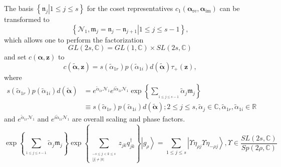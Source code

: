 \documentclass[aps,preprint]{revtex4}%
\begin{document}
The basis $\left\{  \left.  \mathfrak{n}_{j}\right\vert 1\leq j\leq s\right\}
$ for the coset representatives $c_{1}\left(  \mathbf{\alpha}_{\mathrm{re}%
},\mathbf{\alpha}_{\mathrm{im}}\right)  $ can be transformed to
\begin{equation}
\left\{  \left.  \mathcal{N}_{1},\mathfrak{m}_{j}=\mathfrak{n}_{j}%
-\mathfrak{n}_{j+1}\right\vert 1\leq j\leq s-1\right\}  ,
\end{equation}
which allows one to perform the factorization
\begin{equation}
GL\left(  2s,\mathbb{C}\right)  =GL\left(  1,\mathbb{C}\right)  \times
SL\left(  2s,\mathbb{C}\right)
\end{equation}
and set $c\left(  \mathbf{\alpha,z}\right)  $ to
\begin{equation}
c\left(  \mathbf{\tilde{\alpha},z}\right)  =\mathit{s}\left(  \tilde{\alpha
}_{1r}\right)  \mathit{p}\left(  \tilde{\alpha}_{1i}\right)  d\left(
\mathbf{\tilde{\alpha}}\right)  \tau_{+}\left(  \mathbf{z}\right)  ,
\end{equation}
where
\begin{align}
\mathit{s}\left(  \tilde{\alpha}_{1r}\right)  \mathit{p}\left(  \tilde{\alpha
}_{1i}\right)  d\left(  \mathbf{\tilde{\alpha}}\right)   &  =e^{\tilde{\alpha
}_{1r}\mathcal{N}_{1}}e^{i\tilde{\alpha}_{1i}\mathcal{N}_{1}}\exp\left\{
\sum\limits_{_{1\leq j\leq s-1}}\tilde{\alpha}_{j}\mathfrak{m}_{j}\right\} \\
&  \equiv\mathit{s}\left(  \tilde{\alpha}_{1r}\right)  \mathit{p}\left(
\tilde{\alpha}_{1i}\right)  d\left(  \mathbf{\tilde{\alpha}}\right)  ;2\leq
j\leq s,\tilde{\alpha}_{j}\in\mathbb{C},\tilde{\alpha}_{1r},\tilde{\alpha
}_{1i}\in\mathbb{R}%
\end{align}
and $e^{\tilde{\alpha}_{1r}\mathcal{N}_{1}}$ and $e^{i\tilde{\alpha}%
_{1i}\mathcal{N}_{1}}$ are overall scaling and phase factors.
\begin{equation}
\exp\left\{  \sum\limits_{_{1\leq j\leq s-1}}\tilde{\alpha}_{j}\mathfrak{m}%
_{j}\right\}  \exp\left\{  \sum\limits_{_{\substack{-s\leq j<k\leq
s\\\left\vert j\right\vert \neq\left\vert k\right\vert }}}z_{jk}%
q_{jk}^{\dagger}\right\}  \left\vert g_{\rho}\right\rangle =\sum_{1\leq j\leq
s}\left\vert \Upsilon\eta_{\rho j}\Upsilon\eta_{-\rho j}\right\rangle
,\Upsilon\in\frac{SL\left(  2s,\mathbb{C}\right)  }{Sp\left(  2\rho
,\mathbb{C}\right)  }%
\end{equation}
\end{document}

